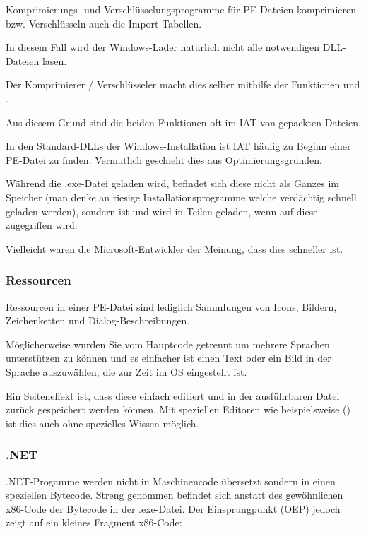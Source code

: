 Komprimierungs- und Verschlüsselungsprogramme für PE-Dateien komprimieren bzw.
Verschlüsseln auch die Import-Tabellen.

In diesem Fall wird der Windows-Lader natürlich nicht alle notwendigen DLL-Dateien lasen.

Der Komprimierer / Verschlüsseler macht dies selber mithilfe der Funktionen
 und .

Aus diesem Grund sind die beiden Funktionen oft im \ac{IAT} von gepackten Dateien.

In den Standard-DLLs der Windows-Installation ist \ac{IAT} häufig zu Beginn einer
PE-Datei zu finden. Vermutlich geschieht dies aus Optimierungsgründen.

Während die .exe-Datei geladen wird, befindet sich diese nicht als Ganzes im Speicher
(man denke an riesige Installationsprogramme welche verdächtig schnell geladen werden),
sondern ist  und wird in Teilen geladen, wenn auf diese zugegriffen wird.

Vielleicht waren die Microsoft-Entwickler der Meinung, dass dies schneller ist.

\subsubsection{Ressourcen}

\label{PEresources}

Ressourcen in einer PE-Datei sind lediglich Sammlungen von Icons, Bildern,
Zeichenketten und Dialog-Beschreibungen.

Möglicherweise wurden Sie vom Hauptcode getrennt um mehrere Sprachen unterstützen
zu können und es einfacher ist einen Text oder ein Bild in der Sprache auszuwählen,
die zur Zeit im \ac{OS} eingestellt ist.

Ein Seiteneffekt ist, dass diese einfach editiert und in der ausführbaren Datei
zurück gespeichert werden können. Mit speziellen Editoren wie beispielsweise
() ist dies auch ohne spezielles Wissen möglich.

\subsubsection{.NET}


.NET-Progamme werden nicht in Maschinencode übersetzt sondern in einen speziellen Bytecode.
Streng genommen befindet sich anstatt des gewöhnlichen x86-Code der Bytecode in
der .exe-Datei. Der Einsprungpunkt (\ac{OEP}) jedoch zeigt auf ein kleines Fragment
x86-Code:

